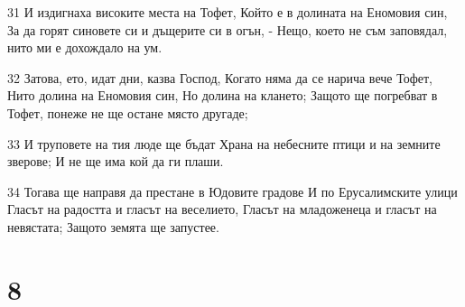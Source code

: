 \par 31 И издигнаха високите места на Тофет, Който е в долината на Еномовия син, За да горят синовете си и дъщерите си в огън, - Нещо, което не съм заповядал, нито ми е дохождало на ум.
\par 32 Затова, ето, идат дни, казва Господ, Когато няма да се нарича вече Тофет, Нито долина на Еномовия син, Но долина на клането; Защото ще погребват в Тофет, понеже не ще остане място другаде;
\par 33 И труповете на тия люде ще бъдат Храна на небесните птици и на земните зверове; И не ще има кой да ги плаши.
\par 34 Тогава ще направя да престане в Юдовите градове И по Ерусалимските улици Гласът на радостта и гласът на веселието, Гласът на младоженеца и гласът на невястата; Защото земята ще запустее.

\chapter{8}

